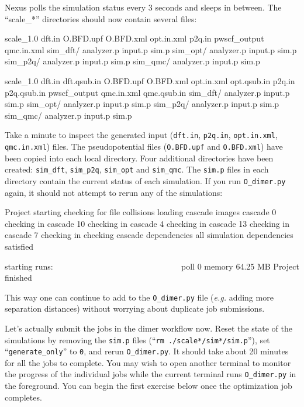\noindent
Nexus polls the simulation status every 3 seconds and sleeps in between.  The ``scale\_*'' directories should now contain several files:
\ifws
\begin{shade}
scale_1.0
   dft.in
   O.BFD.upf
   O.BFD.xml
   opt.in.xml
   p2q.in
   pwscf_output
   qmc.in.xml
   sim_dft/
       analyzer.p
       input.p
       sim.p
   sim_opt/
       analyzer.p
       input.p
       sim.p
   sim_p2q/
       analyzer.p
       input.p
       sim.p
   sim_qmc/
       analyzer.p
       input.p
       sim.p
\end{shade}
\else
\begin{shade}
scale_1.0
   dft.in
   dft.qsub.in
   O.BFD.upf
   O.BFD.xml
   opt.in.xml
   opt.qsub.in
   p2q.in
   p2q.qsub.in
   pwscf_output
   qmc.in.xml
   qmc.qsub.in
   sim_dft/
       analyzer.p
       input.p
       sim.p
   sim_opt/
       analyzer.p
       input.p
       sim.p
   sim_p2q/
       analyzer.p
       input.p
       sim.p
   sim_qmc/
       analyzer.p
       input.p
       sim.p
\end{shade}
\fi
\noindent
Take a minute to inspect the generated input (\texttt{dft.in}, \texttt{p2q.in}, \texttt{opt.in.xml}, \texttt{qmc.in.xml})  files.  The pseudopotential files (\texttt{O.BFD.upf} and \texttt{O.BFD.xml}) have been copied into each local directory. Four additional directories have been created: \texttt{sim\_dft},  \texttt{sim\_p2q}, \texttt{sim\_opt} and \texttt{sim\_qmc}.  The \texttt{sim.p} files in each directory contain the current status of each simulation.  If you run \texttt{O\_dimer.py} again, it should not attempt to rerun any of the simulations:   
\begin{shade}
Project starting 
  checking for file collisions 
  loading cascade images 
    cascade 0 checking in 
    cascade 10 checking in 
    cascade 4 checking in 
    cascade 13 checking in 
    cascade 7 checking in 
  checking cascade dependencies 
    all simulation dependencies satisfied 
  
  starting runs:
  ~~~~~~~~~~~~~~~~~~~~~~~~~~~~~~ 
  poll 0  memory 64.25 MB 
Project finished
\end{shade}
\noindent
This way one can continue to add to the \texttt{O\_dimer.py} file (\emph{e.g.} adding more separation distances) without worrying about duplicate job submissions.

Let's actually submit the jobs in the dimer workflow now.  Reset the state of the simulations by removing the \texttt{sim.p} files (``\texttt{rm ./scale*/sim*/sim.p}''), set ``\texttt{generate\_only}'' to \texttt{0}, and rerun \texttt{O\_dimer.py}.  It should take about 20 minutes for all the jobs to complete.  You may wish to open another terminal to monitor the progress of the individual jobs while the current terminal runs \texttt{O\_dimer.py} in the foreground.  You can begin the first exercise below once the optimization job completes.

